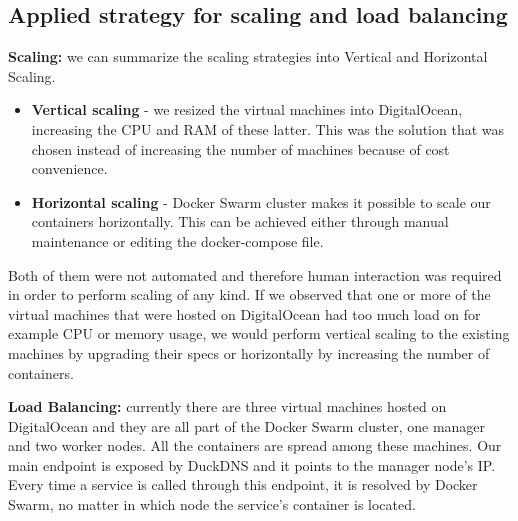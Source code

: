 \subsection{Applied strategy for scaling and load balancing}

\textbf{Scaling:} we can summarize the scaling strategies into Vertical and Horizontal Scaling. 
\begin{itemize}
    \item \textbf{Vertical scaling} - we resized the virtual machines into DigitalOcean, increasing the CPU and RAM of these latter. This was the solution that was chosen instead of increasing the number of machines because of cost convenience.
    \item \textbf{Horizontal scaling} -  Docker Swarm cluster makes it possible to scale our containers horizontally. This can be achieved either through manual maintenance or editing the docker-compose file.
\end{itemize}

Both of them were not automated and therefore human interaction was required in order to perform scaling of any kind. If we observed that one or more of the virtual machines that were hosted on DigitalOcean had too much load on for example CPU or memory usage, we would perform vertical scaling to the existing machines by upgrading their specs or horizontally by increasing the number of containers.

\textbf{Load Balancing: }currently there are three virtual machines hosted on DigitalOcean and they are all part of the Docker Swarm cluster, one manager and two worker nodes. All the containers are spread among these machines. Our main endpoint is exposed by DuckDNS and it points to the manager node's IP. Every time a service is called through this endpoint, it is resolved by Docker Swarm, no matter in which node the service's container is located.

